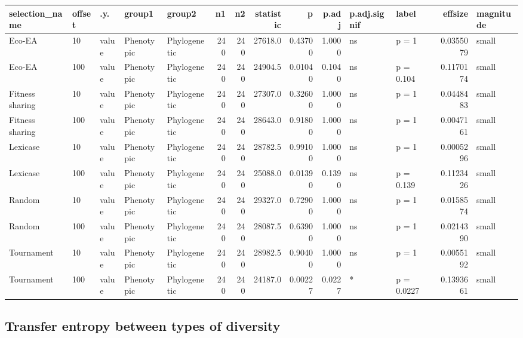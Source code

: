 \documentclass[]{book}
\begin{document}
\begin{table}
\centering
\begin{tabular}[t]{l|l|l|l|l|r|r|r|r|r|l|l|r|l}
\hline
selection\_name & offset & .y. & group1 & group2 & n1 & n2 & statistic & p & p.adj & p.adj.signif & label & effsize & magnitude\\
\hline
Eco-EA & 10 & value & Phenotypic & Phylogenetic & 240 & 240 & 27618.0 & 0.43700 & 1.0000 & ns & p = 1 & 0.0355079 & small\\
\hline
Eco-EA & 100 & value & Phenotypic & Phylogenetic & 240 & 240 & 24904.5 & 0.01040 & 0.1040 & ns & p = 0.104 & 0.1170174 & small\\
\hline
Fitness sharing & 10 & value & Phenotypic & Phylogenetic & 240 & 240 & 27307.0 & 0.32600 & 1.0000 & ns & p = 1 & 0.0448483 & small\\
\hline
Fitness sharing & 100 & value & Phenotypic & Phylogenetic & 240 & 240 & 28643.0 & 0.91800 & 1.0000 & ns & p = 1 & 0.0047161 & small\\
\hline
Lexicase & 10 & value & Phenotypic & Phylogenetic & 240 & 240 & 28782.5 & 0.99100 & 1.0000 & ns & p = 1 & 0.0005296 & small\\
\hline
Lexicase & 100 & value & Phenotypic & Phylogenetic & 240 & 240 & 25088.0 & 0.01390 & 0.1390 & ns & p = 0.139 & 0.1123426 & small\\
\hline
Random & 10 & value & Phenotypic & Phylogenetic & 240 & 240 & 29327.0 & 0.72900 & 1.0000 & ns & p = 1 & 0.0158574 & small\\
\hline
Random & 100 & value & Phenotypic & Phylogenetic & 240 & 240 & 28087.5 & 0.63900 & 1.0000 & ns & p = 1 & 0.0214390 & small\\
\hline
Tournament & 10 & value & Phenotypic & Phylogenetic & 240 & 240 & 28982.5 & 0.90400 & 1.0000 & ns & p = 1 & 0.0055192 & small\\
\hline
Tournament & 100 & value & Phenotypic & Phylogenetic & 240 & 240 & 24187.0 & 0.00227 & 0.0227 & * & p = 0.0227 & 0.1393661 & small\\
\hline
\end{tabular}
\end{table}

\hypertarget{transfer-entropy-between-types-of-diversity-1}{%
\subsection{Transfer entropy between types of diversity}\label{transfer-entropy-between-types-of-diversity-1}}
\end{document}
